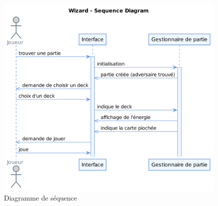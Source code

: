 \documentclass[11pt,a4paper]{article}
\begin{document}
\begin{figure}[ht]
  \centering
  \includegraphics[width=1\textwidth]{uml_files/SequenceDiagram.png}
  \caption{\label{fig:class} Diagramme de séquence}
\end{figure}

\clearpage
\printindex
\end{document}
